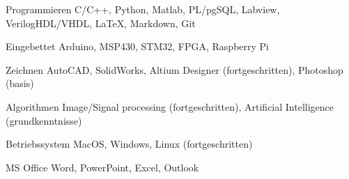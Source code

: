 

\begin{cvskills}

  \cvskill
    {Programmieren} %
    {C/C++, Python, Matlab, PL/pgSQL, Labview, VerilogHDL/VHDL, \LaTeX, Markdown, Git} %

  \cvskill
    {Eingebettet} %
    {Arduino, MSP430, STM32,  FPGA, Raspberry Pi} %

  \cvskill
    {Zeichnen} %
    {AutoCAD, SolidWorks, Altium Designer (fortgeschritten), Photoshop (basis)} %

  \cvskill
    {Algorithmen} %
    {Image/Signal processing (fortgeschritten), Artificial Intelligence (grundkenntnisse)} %

  \cvskill
	{Betriebssystem} %
	{MacOS, Windows, Linux (fortgeschritten)} %

  \cvskill
	{MS Office} %
	{Word, PowerPoint, Excel, Outlook} %


\end{cvskills}
